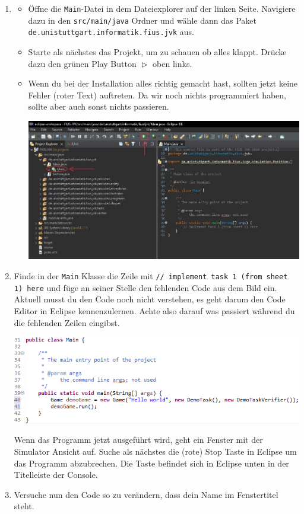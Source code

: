 \begin{enumerate}
    \item
    \begin{itemize}
        \item Öffne die \texttt{Main}-Datei in dem Dateiexplorer auf der linken Seite.
            Navigiere dazu in den \texttt{src/main/java} Ordner und wähle dann das Paket \texttt{de.unistuttgart.informatik.fius.jvk} aus.
        \item Starte als nächstes das Projekt, um zu schauen ob alles klappt.
            Drücke dazu den grünen Play Button $\vartriangleright$ oben links.
        \item Wenn du bei der Installation alles richtig gemacht hast, sollten jetzt keine Fehler (roter Text) auftreten.
            Da wir noch nichts programmiert haben, sollte aber auch sonst nichts passieren.
        \begin{center}
            \includegraphics[width=\linewidth]{./figures/ide.jpg}
        \end{center}
    \end{itemize}

    \item Finde in der \lstinline{Main} Klasse die Zeile mit \lstinline{// implement task 1 (from sheet 1) here} und füge an seiner Stelle den fehlenden Code aus dem Bild ein.
    Aktuell musst du den Code noch nicht verstehen, es geht darum den Code Editor in Eclipse kennenzulernen.
    Achte also darauf was passiert während du die fehlenden Zeilen eingibst.

    \includegraphics[width=\linewidth]{./figures/code.1.png}

    Wenn das Programm jetzt ausgeführt wird, geht ein Fenster mit der Simulator Ansicht auf.
    Suche als nächstes die (rote) Stop Taste in Eclipse um das Programm abzubrechen.
    Die Taste befindet sich in Eclipse unten in der Titelleiste der Console.
    \item Versuche nun den Code so zu verändern, dass dein Name im Fenstertitel steht.
\end{enumerate}


